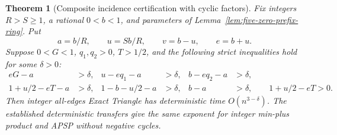 \documentclass[11pt]{article}
\newtheorem{theorem}{Theorem}
\begin{document}
\begin{theorem}[Composite incidence certification with cyclic factors]
\label{thm:cyclic-factor-apsp}
Fix integers $R>S\ge1$, a rational $0<b<1$, and parameters of
Lemma~\ref{lem:five-zero-prefix-ring}. Put
\[
 a=b/R,\qquad u=Sb/R,\qquad v=b-u,\qquad e=b+u.
\]
Suppose $0<G<1$, $q_1,q_2>0$, $T>1/2$, and the following strict
inequalities hold for some $\delta>0$:
\begin{align*}
 eG-a&>\delta,& u-eq_1-a&>\delta,& b-eq_2-a&>\delta,\\
 1+u/2-eT-a&>\delta,&1-b-u/2-a&>\delta,&b-a&>\delta,
 \qquad 1+u/2-eT>0.
\end{align*}
Then integer all-edges Exact Triangle has deterministic time
$O(n^{3-\delta})$. The established deterministic transfers give the same
exponent for integer min-plus product and APSP without negative cycles.
\end{theorem}
\end{document}
